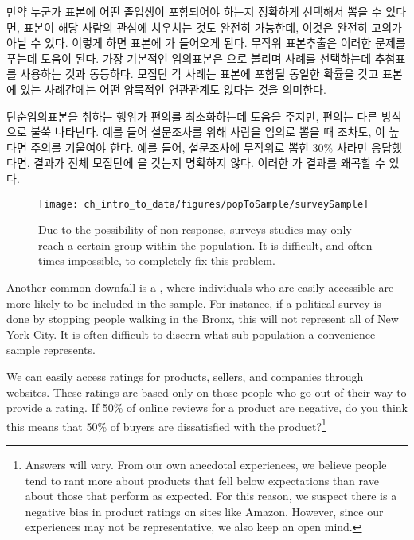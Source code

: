 만약 누군가 표본에 어떤 졸업생이 포함되어야 하는지 정확하게 선택해서 뽑을 수 있다면, 표본이 해당 사람의 관심에 치우치는 것도 완전히 가능한데, 이것은 완전히 고의가 아닐 수 있다. 이렇게 하면 표본에 가 들어오게 된다. 무작위 표본추출은 이러한 문제를 푸는데 도움이 된다. 가장 기본적인 임의표본은  으로 불리며 사례를 선택하는데 추첨표를 사용하는 것과 동등하다.
모집단 각 사례는 표본에 포함될 동일한 확률을 갖고 표본에 있는 사례간에는 어떤 암묵적인 연관관계도 없다는 것을 의미한다.


단순임의표본을 취하는 행위가 편의를 최소화하는데 도움을 주지만, 편의는 다른 방식으로 불쑥 나타난다.
예를 들어 설문조사를 위해 사람을 임의로 뽑을 때 조차도,  이 높다면 주의를 기울여야 한다.
예를 들어, 설문조사에 무작위로 뽑힌 30\% 사라만 응답했다면,
결과가 전체 모집단에 을 갖는지 명확하지 않다. 이러한  가 결과를 
왜곡할 수 있다.

\begin{figure}[h]
\centering
\texttt{[image: ch\_intro\_to\_data/figures/popToSample/surveySample]}
\caption{Due to the possibility of non-response, surveys studies may only reach a certain group within the population. It is difficult, and often times impossible, to completely fix this problem.}
\label{surveySample}
\end{figure}

Another common downfall is a , where individuals who are easily accessible are more likely to be included in the sample. For instance, if a political survey is done by stopping people walking in the Bronx, this will not represent all of New York City. It is often difficult to discern what sub-population a convenience sample represents.

\begin{exercise}
We can easily access ratings for products, sellers, and companies through websites. These ratings are based only on those people who go out of their way to provide a rating. If 50\% of online reviews for a product are negative, do you think this means that 50\% of buyers are dissatisfied with the product?\footnote{Answers will vary. From our own anecdotal experiences, we believe people tend to rant more about products that fell below expectations than rave about those that perform as expected. For this reason, we suspect there is a negative bias in product ratings on sites like Amazon. However, since our experiences may not be representative, we also keep an open mind.}
\end{exercise}

